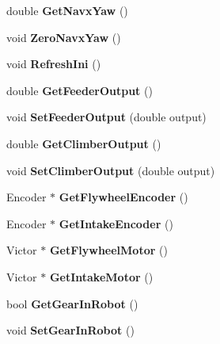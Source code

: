 \begin{DoxyCompactItemize}
\item 
\mbox{\label{class_robot_model_a48702daa83b141eb0dd1dc6f0fd75c35}} 
double {\bfseries Get\+Navx\+Yaw} ()
\item 
\mbox{\label{class_robot_model_a49cf4f33221954e0efbfc14dae477595}} 
void {\bfseries Zero\+Navx\+Yaw} ()
\item 
\mbox{\label{class_robot_model_a3f5ac4f1f526f4610573fc3dbcdc722c}} 
void {\bfseries Refresh\+Ini} ()
\item 
\mbox{\label{class_robot_model_a66eb15697284c9f84e81274c42074f98}} 
double {\bfseries Get\+Feeder\+Output} ()
\item 
\mbox{\label{class_robot_model_a60b4ba0082d91ec75d49584532ce17d5}} 
void {\bfseries Set\+Feeder\+Output} (double output)
\item 
\mbox{\label{class_robot_model_a83cf79ec3a2c2f89846bbc8f1371d061}} 
double {\bfseries Get\+Climber\+Output} ()
\item 
\mbox{\label{class_robot_model_a3c3562ec10706ee53e7d304c7f69e136}} 
void {\bfseries Set\+Climber\+Output} (double output)
\item 
\mbox{\label{class_robot_model_a08ca5e903c521ab19e40dc7ab34ccf16}} 
Encoder $\ast$ {\bfseries Get\+Flywheel\+Encoder} ()
\item 
\mbox{\label{class_robot_model_a421afc34c2fa51b2d4a0fb26d0115e0a}} 
Encoder $\ast$ {\bfseries Get\+Intake\+Encoder} ()
\item 
\mbox{\label{class_robot_model_a2a91026e2bbd046d355c2619990ac537}} 
Victor $\ast$ {\bfseries Get\+Flywheel\+Motor} ()
\item 
\mbox{\label{class_robot_model_a2e186d42b8fcbee137e01072dbd160a1}} 
Victor $\ast$ {\bfseries Get\+Intake\+Motor} ()
\item 
\mbox{\label{class_robot_model_a87b1558491f004d77a0d5fd308cae225}} 
bool {\bfseries Get\+Gear\+In\+Robot} ()
\item 
\mbox{\label{class_robot_model_af4fb53182642778b932b510fe2b9bec1}} 
void {\bfseries Set\+Gear\+In\+Robot} ()
\end{DoxyCompactItemize}
